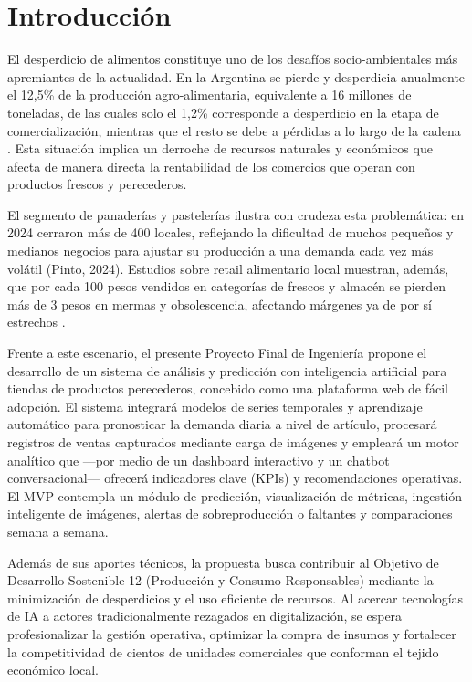 \chapter{Introducción}

El desperdicio de alimentos constituye uno de los desafíos socio-ambientales más apremiantes de la actualidad. En la Argentina se pierde y desperdicia anualmente el 12,5\% de la producción agro-alimentaria, equivalente a 16 millones de toneladas, de las cuales solo el 1,2\% corresponde a desperdicio en la etapa de comercialización, mientras que el resto se debe a pérdidas a lo largo de la cadena \parencite{tiscornia2022}. Esta situación implica un derroche de recursos naturales y económicos que afecta de manera directa la rentabilidad de los comercios que operan con productos frescos y perecederos.

El segmento de panaderías y pastelerías ilustra con crudeza esta problemática: en 2024 cerraron más de 400 locales, reflejando la dificultad de muchos pequeños y medianos negocios para ajustar su producción a una demanda cada vez más volátil (Pinto, 2024). Estudios sobre retail alimentario local muestran, además, que por cada 100 pesos vendidos en categorías de frescos y almacén se pierden más de 3 pesos en mermas y obsolescencia, afectando márgenes ya de por sí estrechos \parencite{weteam2021}.

Frente a este escenario, el presente Proyecto Final de Ingeniería propone el desarrollo de un sistema de análisis y predicción con inteligencia artificial para tiendas de productos perecederos, concebido como una plataforma web de fácil adopción. El sistema integrará modelos de series temporales y aprendizaje automático para pronosticar la demanda diaria a nivel de artículo, procesará registros de ventas capturados mediante carga de imágenes y empleará un motor analítico que —por medio de un dashboard interactivo y un chatbot conversacional— ofrecerá indicadores clave (KPIs) y recomendaciones operativas. El MVP contempla un módulo de predicción, visualización de métricas, ingestión inteligente de imágenes, alertas de sobreproducción o faltantes y comparaciones semana a semana.

Además de sus aportes técnicos, la propuesta busca contribuir al Objetivo de Desarrollo Sostenible 12 (Producción y Consumo Responsables) mediante la minimización de desperdicios y el uso eficiente de recursos. Al acercar tecnologías de IA a actores tradicionalmente rezagados en digitalización, se espera profesionalizar la gestión operativa, optimizar la compra de insumos y fortalecer la competitividad de cientos de unidades comerciales que conforman el tejido económico local.

